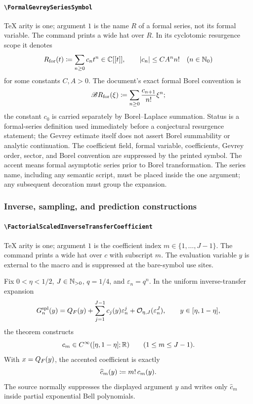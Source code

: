 \documentclass[11pt,oneside]{article}
\theoremstyle{definition}
\theoremstyle{remark}
\DeclareRobustCommand{\commandname}[1]{\texttt{\textbackslash#1}}
\DeclareRobustCommand{\localaccentname}[1]{\commandname{#1}}
\begin{document}
\paragraph{\localaccentname{FormalGevreySeriesSymbol}}
TeX arity is one; argument \(1\) is the name \(R\) of a formal series, not its
formal variable.  The command prints a wide hat over \(R\).  In its cyclotomic
resurgence scope it denotes
\[
 R_{\mathrm{for}}(t)
 \mathrel{\coloneqq}
 \sum_{n\ge0}c_nt^n
 \in\mathbb{C}[[t]],
 \qquad
 \left\lvert c_n\right\rvert\le CA^n n!
 \quad(n\in\mathbb{N}_{0})
\]
for some constants \(C,A>0\).  The document's exact formal Borel convention is
\[
 \mathscr B R_{\mathrm{for}}(\xi)
 \mathrel{\coloneqq}
 \sum_{n\ge0}\frac{c_{n+1}}{n!}\xi^n;
\]
the constant \(c_0\) is carried separately by Borel--Laplace summation.
Status is a formal-series definition used immediately before a conjectural
resurgence statement; the Gevrey estimate itself does not assert Borel
summability or analytic continuation.  The coefficient field, formal variable,
coefficients, Gevrey order, sector, and Borel convention are suppressed by the
printed symbol.  The accent means formal asymptotic series prior to Borel
transformation.  The series name, including any semantic script, must be placed
inside the one argument; any subsequent decoration must group the expansion.

\subsubsection{Inverse, sampling, and prediction constructions}

\paragraph{\localaccentname{FactorialScaledInverseTransferCoefficient}}
TeX arity is one; argument \(1\) is the coefficient index
\(m\in\{1,\ldots,J-1\}\).  The command prints a wide hat over \(c\) with
subscript \(m\).  The evaluation variable \(y\) is external to the macro and
is suppressed at the bare-symbol use sites.

Fix \(0<\eta<1/2\), \(J\in\mathbb{N}_{>0}\), \(q=1/4\), and
\(\varepsilon_n=q^n\).  In the uniform inverse-transfer expansion
\[
 G_n^{\mathrm{spl}}(y)
 =
 Q_{F}(y)
 +\sum_{j=1}^{J-1}c_j(y)\varepsilon_n^j
 +\mathcal{O}_{\eta,J}(\varepsilon_n^J),
 \qquad y\in[\eta,1-\eta],
\]
the theorem constructs
\[
 c_m\in C^\infty([\eta,1-\eta];\mathbb{R})
 \qquad(1\le m\le J-1).
\]
With \(x=Q_{F}(y)\), the accented coefficient is exactly
\[
 \widehat c_m(y)\mathrel{\coloneqq} m!\,c_m(y).
\]
The source normally suppresses the displayed argument \(y\) and writes only
\(\widehat c_m\) inside partial exponential Bell polynomials.
\end{document}
